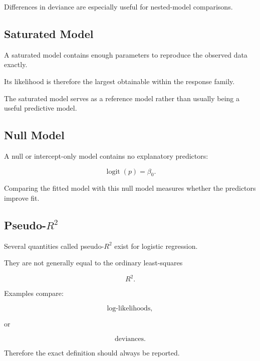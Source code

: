 Differences in deviance are especially useful for nested-model
comparisons.

\subsection{Saturated Model}
\label{subsec:saturated-model}

A saturated model contains enough parameters to reproduce the observed
data exactly.

Its likelihood is therefore the largest obtainable within the response
family.

The saturated model serves as a reference model rather than usually
being a useful predictive model.

\subsection{Null Model}
\label{subsec:null-model-logistic}

A null or intercept-only model contains no explanatory predictors:

\[
\boxed{
\operatorname{logit}(p)
=
\beta_0.
}
\]

Comparing the fitted model with this null model measures whether the
predictors improve fit.

\subsection{Pseudo-\(R^2\)}
\label{subsec:pseudo-r-squared}

Several quantities called pseudo-\(R^2\) exist for logistic regression.

They are not generally equal to the ordinary least-squares

\[
R^2.
\]

Examples compare:

\[
\boxed{
\text{log-likelihoods},
}
\]

or

\[
\boxed{
\text{deviances}.
}
\]

Therefore the exact definition should always be reported.

